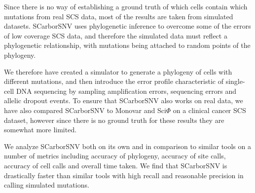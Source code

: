 \documentclass[../../main.tex]{subfiles}
\begin{document}
Since there is no way of establishing a ground truth of which cells contain which mutations from real SCS data, most of the results are taken from simulated datasets.
SCarborSNV uses phylogenetic inference to overcome some of the errors of low coverage SCS data, and therefore the simulated data must reflect a phylogenetic relationship, with mutations being attached to random points of the phylogeny.

We therefore have created a simulator to generate a phylogeny of cells with different mutations, and then introduce the error profile characteristic of single-cell DNA sequencing by sampling amplification errors, sequencing errors and allelic dropout events.
To ensure that SCarborSNV also works on real data, we have also compared SCarborSNV to Monovar and Sci$\Phi$ on a clinical cancer SCS dataset, however since there is no ground truth for these results they are somewhat more limited.

We analyze SCarborSNV both on its own and in comparison to similar tools on a number of metrics including accuracy of phylogeny, accuracy of site calls, accuracy of cell calls and overall time taken.
We find that SCarborSNV is drastically faster than similar tools with high recall and reasonable precision in calling simulated mutations.
\end{document}
